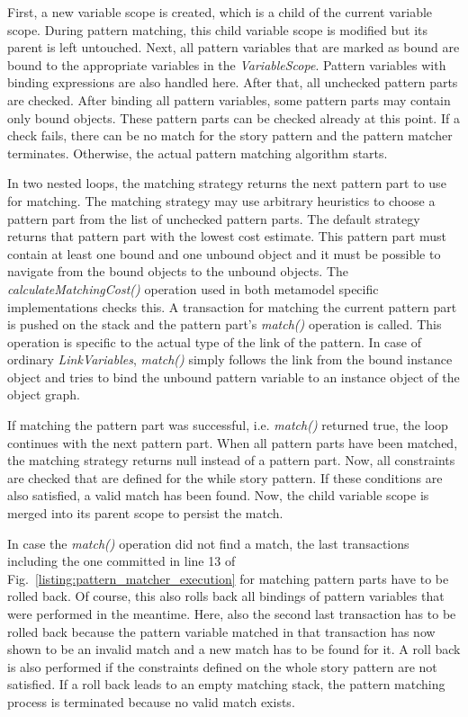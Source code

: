 First, a new variable scope is created, which is a child of the current variable scope.
During pattern matching, this child variable scope is modified but its parent is left untouched.
Next, all pattern variables that are marked as bound are bound to the appropriate variables in the \emph{VariableScope}.
Pattern variables with binding expressions are also handled here.
After that, all unchecked pattern parts are checked.
After binding all pattern variables, some pattern parts may contain only bound objects.
These pattern parts can be checked already at this point.
If a check fails, there can be no match for the story pattern and the pattern matcher terminates.
Otherwise, the actual pattern matching algorithm starts.

In two nested loops, the matching strategy returns the next pattern part to use for matching.
The matching strategy may use arbitrary heuristics to choose a pattern part from the list of unchecked pattern parts.
The default strategy returns that pattern part with the lowest cost estimate.
This pattern part must contain at least one bound and one unbound object and it must be possible to navigate from the bound objects to the unbound objects.
The \emph{calculateMatchingCost()} operation used in both metamodel specific implementations checks this.
A transaction for matching the current pattern part is pushed on the stack and the pattern part's \emph{match()} operation is called.
This operation is specific to the actual type of the link of the pattern.
In case of ordinary \emph{LinkVariables}, \emph{match()} simply follows the link from the bound instance object and tries to bind the unbound pattern variable to an instance object of the object graph.

If matching the pattern part was successful, i.e. \emph{match()} returned true, the loop continues with the next pattern part.
When all pattern parts have been matched, the matching strategy returns null instead of a pattern part.
Now, all constraints are checked that are defined for the while story pattern.
If these conditions are also satisfied, a valid match has been found.
Now, the child variable scope is merged into its parent scope to persist the match.

In case the \emph{match()} operation did not find a match, the last transactions including the one committed in line 13 of Fig.~\ref{listing:pattern_matcher_execution} for matching pattern parts have to be rolled back.
Of course, this also rolls back all bindings of pattern variables that were performed in the meantime.
Here, also the second last transaction has to be rolled back because the pattern variable matched in that transaction has now shown to be an invalid match and a new match has to be found for it.
A roll back is also performed if the constraints defined on the whole story pattern are not satisfied.
If a roll back leads to an empty matching stack, the pattern matching process is terminated because no valid match exists.


